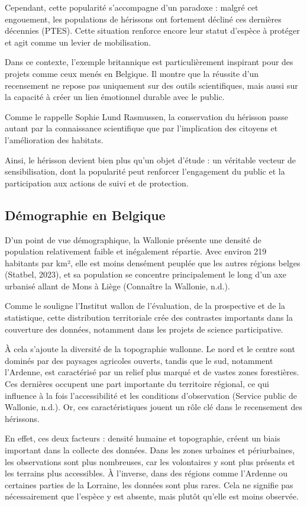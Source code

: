 \documentclass[a4paper,11pt]{article}
\begin{document}
Cependant, cette popularité s’accompagne d’un paradoxe : malgré cet engouement, les populations de hérissons ont fortement décliné ces dernières décennies (PTES). Cette situation renforce encore leur statut d’espèce à protéger et agit comme un levier de mobilisation.

Dans ce contexte, l’exemple britannique est particulièrement inspirant pour des projets comme ceux menés en Belgique. Il montre que la réussite d’un recensement ne repose pas uniquement sur des outils scientifiques, mais aussi sur la capacité à créer un lien émotionnel durable avec le public. 

Comme le rappelle Sophie Lund Rasmussen, la conservation du hérisson passe autant par la connaissance scientifique que par l’implication des citoyens et l’amélioration des habitats.

Ainsi, le hérisson devient bien plus qu’un objet d’étude : un véritable vecteur de sensibilisation, dont la popularité peut renforcer l’engagement du public et la participation aux actions de suivi et de protection.

\subsection{Démographie en Belgique}

D’un point de vue démographique, la Wallonie présente une densité de population relativement faible et inégalement répartie. Avec environ 219 habitants par km², elle est moins densément peuplée que les autres régions belges (Statbel, 2023), et sa population se concentre principalement le long d’un axe urbanisé allant de Mons à Liège (Connaître la Wallonie, n.d.). 

Comme le souligne l’Institut wallon de l’évaluation, de la prospective et de la statistique, cette distribution territoriale crée des contrastes importants dans la couverture des données, notamment dans les projets de science participative.

À cela s’ajoute la diversité de la topographie wallonne. Le nord et le centre sont dominés par des paysages agricoles ouverts, tandis que le sud, notamment l’Ardenne, est caractérisé par un relief plus marqué et de vastes zones forestières. Ces dernières occupent une part importante du territoire régional, ce qui influence à la fois l’accessibilité et les conditions d’observation (Service public de Wallonie, n.d.). Or, ces caractéristiques jouent un rôle clé dans le recensement des hérissons.

En effet, ces deux facteurs : densité humaine et topographie, créent un biais important dans la collecte des données. Dans les zones urbaines et périurbaines, les observations sont plus nombreuses, car les volontaires y sont plus présents et les terrains plus accessibles. À l’inverse, dans des régions comme l’Ardenne ou certaines parties de la Lorraine, les données sont plus rares. Cela ne signifie pas nécessairement que l’espèce y est absente, mais plutôt qu’elle est moins observée.
\end{document}
